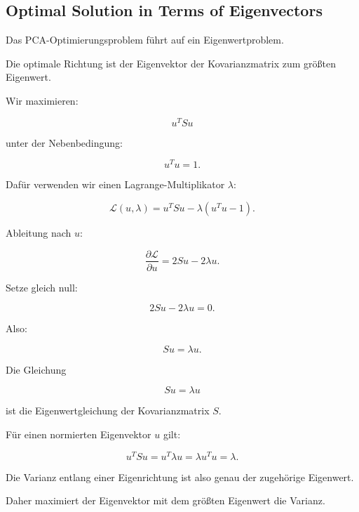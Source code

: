 \documentclass[11pt,a4paper]{scrartcl}
\begin{document}
\subsection{Optimal Solution in Terms of Eigenvectors}

\begin{notebox}
    Das PCA-Optimierungsproblem führt auf ein Eigenwertproblem.

    Die optimale Richtung ist der Eigenvektor der Kovarianzmatrix zum größten
    Eigenwert.
\end{notebox}

\begin{calculationbox}
    Wir maximieren:

    \[
        u^T S u
    \]

    unter der Nebenbedingung:

    \[
        u^T u = 1.
    \]

    Dafür verwenden wir einen Lagrange-Multiplikator \(\lambda\):

    \[
        \mathcal{L}(u,\lambda)
        =
        u^T S u
        -
        \lambda(u^Tu-1).
    \]

    Ableitung nach \(u\):

    \[
        \frac{\partial \mathcal{L}}{\partial u}
        =
        2Su - 2\lambda u.
    \]

    Setze gleich null:

    \[
        2Su - 2\lambda u = 0.
    \]

    Also:

    \[
        Su = \lambda u.
    \]
\end{calculationbox}

\begin{solutionbox}
    Die Gleichung

    \[
        Su = \lambda u
    \]

    ist die Eigenwertgleichung der Kovarianzmatrix \(S\).

    Für einen normierten Eigenvektor \(u\) gilt:

    \[
        u^T S u
        =
        u^T \lambda u
        =
        \lambda u^T u
        =
        \lambda.
    \]

    Die Varianz entlang einer Eigenrichtung ist also genau der zugehörige
    Eigenwert.

    Daher maximiert der Eigenvektor mit dem größten Eigenwert die Varianz.
\end{solutionbox}
\end{document}
